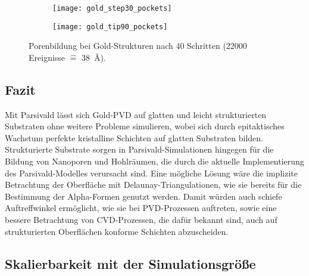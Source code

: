 \begin{figure}
  \captionsetup[subfigure]{singlelinecheck=false}
  \def\subfigwidth{0.49\textwidth}

  \begin{subfigure}[t]{\subfigwidth}
    \texttt{[image: gold\_step30\_pockets]}
    \label{fig:goldpockets-a}
  \end{subfigure}
  \hfill
  \begin{subfigure}[t]{\subfigwidth}
    \texttt{[image: gold\_tip90\_pockets]}
    \label{fig:goldpockets-b}
  \end{subfigure}

  \caption[Porenbildung bei Gold-Strukturen]{Porenbildung bei Gold-Strukturen nach 40 Schritten (\num{22000} Ereignisse $\hat{=}$ \SI{38}{\angstrom}).
  }
  \label{fig:goldpockets}
\end{figure}

\subsection{Fazit}

Mit Parsivald lässt sich Gold-PVD auf glatten und leicht strukturierten Substraten ohne weitere Probleme simulieren, wobei sich durch epitaktisches Wachstum perfekte kristalline Schichten auf glatten Substraten bilden.
Strukturierte Substrate sorgen in Parsivald-Simulationen hingegen für die Bildung von Nanoporen und Hohlräumen, die durch die aktuelle Implementierung des Parsivald-Modelles verursacht sind.
Eine mögliche Lösung wäre die implizite Betrachtung der Oberfläche mit Delaunay-Triangulationen, wie sie bereits für die Bestimmung der Alpha-Formen genutzt werden.
Damit würden auch schiefe Auftreffwinkel ermöglicht, wie sie bei PVD-Prozessen auftreten, sowie eine bessere Betrachtung von CVD-Prozessen, die dafür bekannt sind, auch auf strukturierten Oberflächen konforme Schichten abzuscheiden.

\clearpage

\subsection{Skalierbarkeit mit der Simulationsgröße}
\label{goldscalability}

